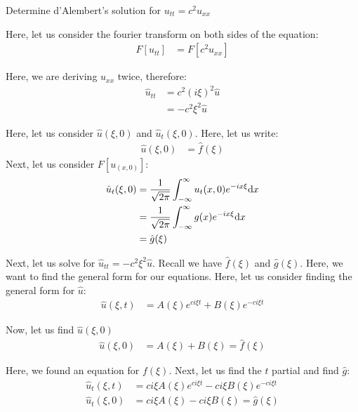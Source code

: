\item Determine d'Alembert's solution for $u_{tt} = c^2u_{xx}$
\bigbreak

Here, let us consider the fourier transform on both sides of the equation:
%
\begin{align}
  F[u_{tt}] & = F[c^2 u_{xx}]
\end{align}

Here, we are deriving $u_{xx}$ twice, therefore:
%
\begin{align}
  \hat u_{tt} & = c^2(i \xi)^2 \hat u\\
  & = - c^2 \xi^2 \hat u
\end{align}

Here, let us consider $\hat u(\xi, 0)$ and $\hat u_t(\xi, 0)$. Here, let us write:
%
\begin{align}
  \hat u(\xi, 0) & = \hat f(\xi)
\end{align}
 Next, let us consider $F[u_(x, 0)]$:
 \begin{align}
   \hat u_t(\xi, 0)
   & = \frac{1}{\sqrt{2 \pi}} \int^\infty_{-\infty} u_t(x, 0) e^{-i x \xi} \text dx\\
   & = \frac{1}{\sqrt{2 \pi}} \int^\infty_{-\infty} g(x) e^{-i x \xi} \text dx\\
   & = \hat g(\xi)
 \end{align}

 Next, let us solve for $\hat u_{tt} = -c^2 \xi^2 \hat u$.
 Recall we have $\hat f(\xi)$ and $\hat g(\xi)$.
 Here, we want to find the general form for our equations. Here, let us consider finding the general form for $\hat u$:
 \begin{align}
   \hat u(\xi, t) & = A(\xi) e^{c i \xi t} + B(\xi) e^{-c i \xi t}
 \end{align}

 Now, let us find $\hat u(\xi, 0)$
 \begin{align}
   \hat u(\xi, 0) & = A(\xi) + B(\xi) = \hat f(\xi)
 \end{align}

Here, we found an equation for $f(\xi)$. Next, let us find the $t$ partial and find $\hat g$:
%
\begin{align}
  \hat u_t(\xi, t) & = c i \xi A(\xi) e^{c i \xi t} - c i \xi B(\xi) e^{-c i \xi t}\\
  \hat u_t(\xi, 0) & = c i \xi A(\xi) - c i \xi B(\xi) = \hat g(\xi)
\end{align}

